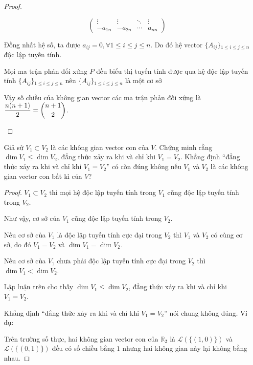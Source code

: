 \documentclass[class=linearalgebra,crop=false]{standalone}
\begin{document}
\begin{proof}
\begin{enumerate}
\[\begin{pmatrix}
                      \vdots  & \vdots  & \ddots & \vdots \\
                      -a_{1n} & -a_{2n} & \cdots & a_{nn}
                  \end{pmatrix}
              \]
              \par Đồng nhất hệ số, ta được $a_{ij} = 0, \forall 1\le i\le j\le n$. Do đó hệ vector $\{ A_{ij} \}{}_{1\le i \le j \le n}$ độc lập tuyến tính.
              \par Mọi ma trận phản đối xứng $P$ đều biểu thị tuyến tính được qua hệ độc lập tuyến tính $\{ A_{ij} \}{}_{1\le i \le j \le n}$ nên $\{ A_{ij} \}{}_{1\le i \le j\le n}$ là một cơ sở
              \par Vậy số chiều của không gian vector các ma trận phản đối xứng là $\dfrac{n(n + 1)}{2} = \dbinom{n+1}{2}$.
    \end{enumerate}
\end{proof}

\begin{exercise}Giả sử $V_{1}\subset V_{2}$ là các không gian vector con của $V$. Chứng minh rằng $\dim V_{1} \le \dim V_{2}$, đẳng thức xảy ra khi và chỉ khi $V_{1} = V_{2}$. Khẳng định ``đẳng thức xảy ra khi và chỉ khi $V_{1} = V_{2}$'' có còn đúng không nếu $V_{1}$ và $V_{2}$ là các không gian vector con bất kì của $V$?
\end{exercise}

\begin{proof}$V_{1}\subset V_{2}$ thì mọi hệ độc lập tuyến tính trong $V_{1}$ cũng độc lập tuyến tính trong $V_{2}$.
    \par Như vậy, cơ sở của $V_{1}$ cũng độc lập tuyến tính trong $V_{2}$.
    \par Nếu cơ sở của $V_{1}$ là độc lập tuyến tính cực đại trong $V_{2}$ thì $V_{1}$ và $V_{2}$ có cùng cơ sở, do đó $V_{1} = V_{2}$ và $\dim V_{1} = \dim V_{2}$.
    \par Nếu cơ sở của $V_{1}$ chưa phải độc lập tuyến tính cực đại trong $V_{2}$ thì $\dim V_{1} < \dim V_{2}$.
    \par Lập luận trên cho thấy $\dim V_{1} \le \dim V_{2}$, đẳng thức xảy ra khi và chỉ khi $V_{1} = V_{2}$.
    \par Khẳng định ``đẳng thức xảy ra khi và chỉ khi $V_{1} = V_{2}$'' nói chung không đúng. Ví dụ:
    \par Trên trường số thực, hai không gian vector con của $\mathbb{R}_{2}$ là $\mathcal{L}(\{ (1,0) \})$ và $\mathcal{L}(\{ (0,1) \})$ đều có số chiều bằng $1$ nhưng hai không gian này lại không bằng nhau.
\end{proof}
\end{document}
